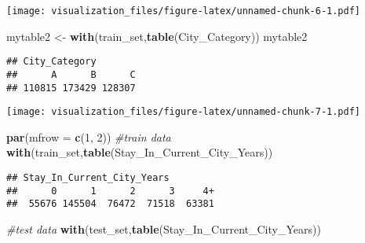 \documentclass[]{article}
\newenvironment{Shaded}{\begin{snugshade}}{\end{snugshade}}
\newcommand{\KeywordTok}[1]{\textcolor[rgb]{0.13,0.29,0.53}{\textbf{#1}}}
\newcommand{\DataTypeTok}[1]{\textcolor[rgb]{0.13,0.29,0.53}{#1}}
\newcommand{\DecValTok}[1]{\textcolor[rgb]{0.00,0.00,0.81}{#1}}
\newcommand{\StringTok}[1]{\textcolor[rgb]{0.31,0.60,0.02}{#1}}
\newcommand{\CommentTok}[1]{\textcolor[rgb]{0.56,0.35,0.01}{\textit{#1}}}
\newcommand{\OperatorTok}[1]{\textcolor[rgb]{0.81,0.36,0.00}{\textbf{#1}}}
\newcommand{\NormalTok}[1]{#1}
\begin{document}
\texttt{[image: visualization\_files/figure-latex/unnamed-chunk-6-1.pdf]}

\begin{Shaded}
\begin{Highlighting}[]
\NormalTok{mytable2 <-}\StringTok{ }\KeywordTok{with}\NormalTok{(train_set,}\KeywordTok{table}\NormalTok{(City_Category))}
\NormalTok{mytable2}
\end{Highlighting}
\end{Shaded}

\begin{verbatim}
## City_Category
##      A      B      C 
## 110815 173429 128307
\end{verbatim}

\begin{Shaded}
\end{Shaded}

\texttt{[image: visualization\_files/figure-latex/unnamed-chunk-7-1.pdf]}

\begin{Shaded}
\begin{Highlighting}[]
\KeywordTok{par}\NormalTok{(}\DataTypeTok{mfrow =} \KeywordTok{c}\NormalTok{(}\DecValTok{1}\NormalTok{, }\DecValTok{2}\NormalTok{))}
\CommentTok{#train data}
\KeywordTok{with}\NormalTok{(train_set,}\KeywordTok{table}\NormalTok{(Stay_In_Current_City_Years))}
\end{Highlighting}
\end{Shaded}

\begin{verbatim}
## Stay_In_Current_City_Years
##      0      1      2      3     4+ 
##  55676 145504  76472  71518  63381
\end{verbatim}

\begin{Shaded}
\begin{Highlighting}[]
\CommentTok{#test data}
\KeywordTok{with}\NormalTok{(test_set,}\KeywordTok{table}\NormalTok{(Stay_In_Current_City_Years))}
\end{Highlighting}
\end{Shaded}
\end{document}
